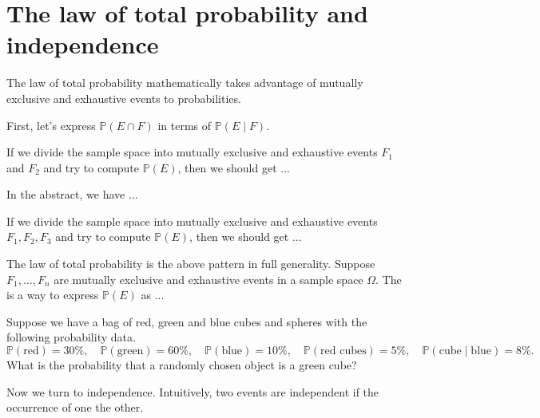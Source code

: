\documentclass[../main.tex]{subfiles}
\begin{document}
 \section{The law of total probability and independence}

The law of total probability mathematically takes advantage  of mutually exclusive and exhaustive events to  probabilities.

First, let's express \(\mathbb{P}(E \cap F)\) in terms of \(\mathbb{P}(E \mid F)\).


If we divide the sample space into mutually exclusive and exhaustive events \(F_{1}\) and \(F_{2}\) and try to compute \(\mathbb{P}(E)\), then we should get ...


In the abstract, we have ...

\blanks*

\clearpage

If we divide the sample space into mutually exclusive and exhaustive events \(F_{1}, F_{2}, F_{3}\) and try to compute \(\mathbb{P}(E)\), then we should get ...


\faStar{} The law of total probability is the above pattern in full generality. Suppose \(F_{1}, \ldots, F_{n}\) are mutually exclusive and exhaustive events in a sample space \(\Omega\). The  is a way to express \(\mathbb{P}(E)\) as ...


\begin{example} \label{ex:total-probability-cubes}
  Suppose we have a bag of red, green and blue cubes and spheres with the following probability data.  
  \[
    \mathbb{P}(\text{red}) = 30\%, \quad
    \mathbb{P}(\text{green}) = 60\%, \quad
    \mathbb{P}(\text{blue}) = 10\%,\quad
    \mathbb{P}(\text{red cubes}) = 5\%,\quad
    \mathbb{P}(\text{cube} \mid \text{blue}) = 8\%.
  \]
  What is the probability that a randomly chosen object is a green cube?

  \blanks*
\end{example}
\clearpage

Now we turn to independence. Intuitively, two events are independent if the occurrence of one  the other.  
\end{document}
